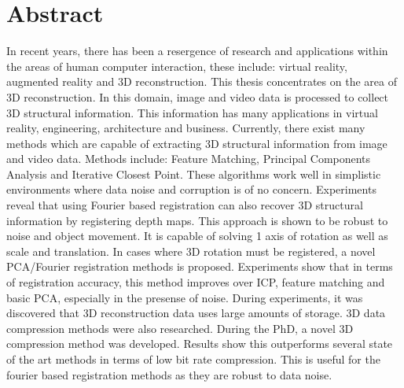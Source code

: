 \makeatletter
\chapter{Abstract}

In recent years, there has been a resergence of research and applications within the areas of human computer interaction, these include: virtual reality, augmented reality and 3D reconstruction. This thesis concentrates on the area of 3D reconstruction. In this domain, image and video data is processed to collect 3D structural information. This information has many applications in virtual reality, engineering, architecture and business. Currently, there exist many methods which are capable of extracting 3D structural information from image and video data. Methods include: Feature Matching, Principal Components Analysis and Iterative Closest Point. These algorithms work well in simplistic environments where data noise and corruption is of no concern. Experiments reveal that using Fourier based registration can also recover 3D structural information by registering depth maps. This approach is shown to be robust to noise and object movement. It is capable of solving 1 axis of rotation as well as scale and translation. In cases where 3D rotation must be registered, a novel PCA/Fourier registration methods is proposed. Experiments show that in terms of registration accuracy, this method improves over ICP, feature matching and basic PCA, especially in the presense of noise. During experiments, it was discovered that 3D reconstruction data uses large amounts of storage. 3D data compression methods were also researched. During the PhD, a novel 3D compression method was developed. Results show this outperforms several state of the art methods in terms of low bit rate compression. This is useful for the fourier based registration methods as they are robust to data noise.